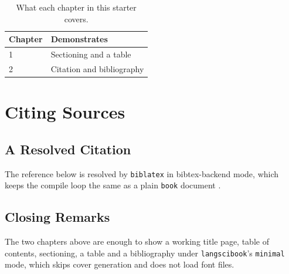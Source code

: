\documentclass[output=book,minimal,biblatexbackend=bibtex]{langscibook}
\begin{document}
\begin{table}[h]
  \centering
  \begin{tabular}{ll}
    \toprule
    Chapter & Demonstrates \\
    \midrule
    1 & Sectioning and a table \\
    2 & Citation and bibliography \\
    \bottomrule
  \end{tabular}
  \caption{What each chapter in this starter covers.}
  \label{tab:sections}
\end{table}

\chapter{Citing Sources}

\section{A Resolved Citation}

The reference below is resolved by \texttt{biblatex} in bibtex-backend mode,
which keeps the compile loop the same as a plain \texttt{book} document
\citep{knuth1984texbook}.

\section{Closing Remarks}

The two chapters above are enough to show a working title page, table of
contents, sectioning, a table and a bibliography under
\texttt{langscibook}'s \texttt{minimal} mode, which skips cover generation and
does not load font files.

\printbibliography
\end{document}
